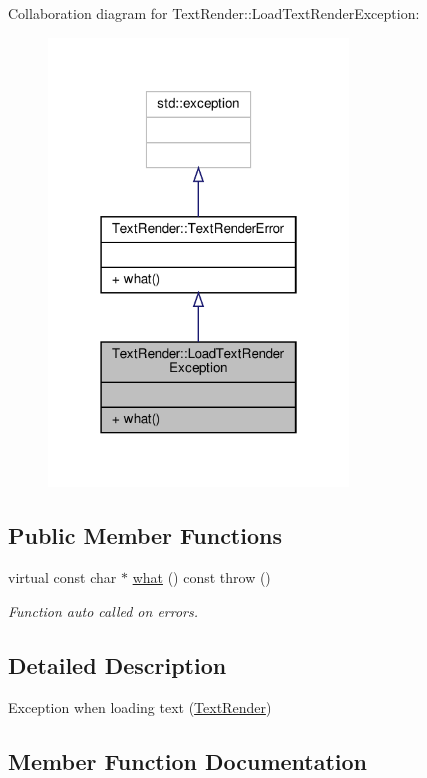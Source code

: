 Collaboration diagram for Text\+Render\+:\+:Load\+Text\+Render\+Exception\+:
\nopagebreak
\begin{figure}[H]
\begin{center}
\leavevmode
\includegraphics[width=226pt]{class_text_render_1_1_load_text_render_exception__coll__graph}
\end{center}
\end{figure}
\subsection*{Public Member Functions}
\begin{DoxyCompactItemize}
\item 
virtual const char $\ast$ \hyperlink{class_text_render_1_1_load_text_render_exception_a487e3cf1f6316e658b47e70cf4f39ee1}{what} () const  throw ()
\begin{DoxyCompactList}\small\item\em Function auto called on errors. \end{DoxyCompactList}\end{DoxyCompactItemize}


\subsection{Detailed Description}
Exception when loading text (\hyperlink{class_text_render}{Text\+Render}) 

\subsection{Member Function Documentation}
\mbox{\label{class_text_render_1_1_load_text_render_exception_a487e3cf1f6316e658b47e70cf4f39ee1}} 
